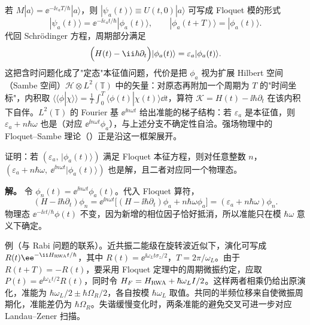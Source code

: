 若 $M|a\rangle=\ee^{-\ii\varepsilon_aT/\hbar}|a\rangle$，则 $|\psi_a(t)\rangle\equiv U(t,0)|a\rangle$ 可写成 Floquet 模的形式
\begin{equation}
|\psi_a(t)\rangle=\ee^{-\ii\varepsilon_a t/\hbar}|\phi_a(t)\rangle,
\qquad
|\phi_a(t+T)\rangle=|\phi_a(t)\rangle.
\label{eq:tdpt-floquet-mode}
\end{equation}
代回 Schr\"odinger 方程，周期部分满足
\begin{equation}
\Bigl(H(t)-\ii\hbar\partial_t\Bigr)|\phi_a(t)\rangle=\varepsilon_a|\phi_a(t)\rangle.
\label{eq:tdpt-floquet-eigen}
\end{equation}
这把含时问题化成了"定态"本征值问题，代价是把 $\phi_a$ 视为扩展 Hilbert 空间（Sambe 空间）$\mathcal H\otimes L^2(\mathbb T)$ 中的矢量：对原态再附加一个周期为 $T$ 的"时间坐标"，内积取 $\langle\!\langle\phi|\chi\rangle\!\rangle=\frac1T\int_0^T\langle\phi(t)|\chi(t)\rangle\dd t$，算符 $\mathcal K=H(t)-\ii\hbar\partial_t$ 在该内积下自伴。$L^2(\mathbb T)$ 的 Fourier 基 $\ee^{\ii n\omega t}$ 给出准能的梯子结构：若 $\varepsilon_a$ 是本征值，则 $\varepsilon_a+n\hbar\omega$ 也是（对应 $\ee^{\ii n\omega t}\phi_a$），与上述分支不确定性自洽。强场物理中的 Floquet--Sambe 理论（）正是沿这一框架展开。


\par
\begin{workedexample}[准能的分支不确定性]
证明：若 $(\varepsilon_a,\,|\phi_a(t)\rangle)$ 满足 Floquet 本征方程，则对任意整数 $n$，$(\varepsilon_a+n\hbar\omega,\ \ee^{\ii n\omega t}|\phi_a(t)\rangle)$ 也是解，且二者对应同一个物理态。

\textbf{解。} 令 \(\phi_n(t)=\ee^{\ii n\omega t}\phi_a(t)\)。代入 Floquet 算符，
\[
(H-\ii\hbar\partial_t)\phi_n=\ee^{\ii n\omega t}\bigl[(H-\ii\hbar\partial_t)\phi_a+n\hbar\omega\phi_a\bigr]=(\varepsilon_a+n\hbar\omega)\phi_n.
\]
物理态 \(\ee^{-\ii\varepsilon t/\hbar}\phi(t)\) 不变，因为新增的相位因子恰好抵消，所以准能只在模 \(\hbar\omega\) 意义下确定。
\end{workedexample}
\par
例（与 Rabi 问题的联系）。近共振二能级在旋转波近似下，演化可写成 $R(t)\ee^{-\ii H_{\rm RWA}t/\hbar}$，其中 $R(t)=\ee^{\ii\omega_Lt\sigma_z/2}$，$T=2\pi/\omega_L$。由于 $R(t+T)=-R(t)$，要采用 Floquet 定理中的周期微振约定，应取 $P(t)=\ee^{\ii\omega_Lt/2}R(t)$，同时令 $H_F=H_{\rm RWA}+\hbar\omega_L I/2$。这样两者相乘仍给出原演化，准能为 $\hbar\omega_L/2\pm\hbar\Omega_R/2$，各自按模 $\hbar\omega_L$ 取值。共同的半频位移来自使微振周期化，准能差仍为 $\hbar\Omega_R$。失谐缓慢变化时，两条准能的避免交叉可进一步对应 Landau--Zener 扫描。

